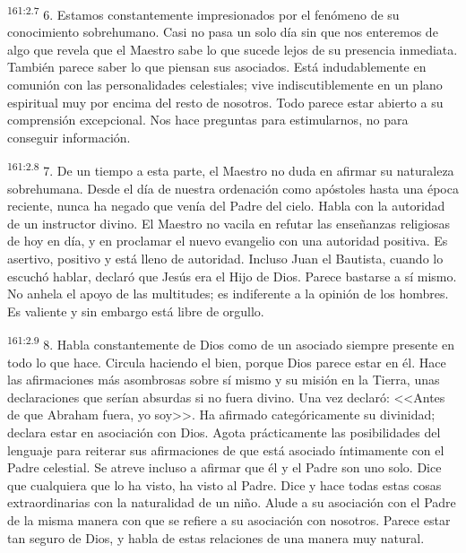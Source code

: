 \par 
\textsuperscript{161:2.7} 6. Estamos constantemente impresionados por el fenómeno de su conocimiento sobrehumano. Casi no pasa un solo día sin que nos enteremos de algo que revela que el Maestro sabe lo que sucede lejos de su presencia inmediata. También parece saber lo que piensan sus asociados. Está indudablemente en comunión con las personalidades celestiales; vive indiscutiblemente en un plano espiritual muy por encima del resto de nosotros. Todo parece estar abierto a su comprensión excepcional. Nos hace preguntas para estimularnos, no para conseguir información.

\par 
\textsuperscript{161:2.8} 7. De un tiempo a esta parte, el Maestro no duda en afirmar su naturaleza sobrehumana. Desde el día de nuestra ordenación como apóstoles hasta una época reciente, nunca ha negado que venía del Padre del cielo. Habla con la autoridad de un instructor divino. El Maestro no vacila en refutar las enseñanzas religiosas de hoy en día, y en proclamar el nuevo evangelio con una autoridad positiva. Es asertivo, positivo y está lleno de autoridad. Incluso Juan el Bautista, cuando lo escuchó hablar, declaró que Jesús era el Hijo de Dios. Parece bastarse a sí mismo. No anhela el apoyo de las multitudes; es indiferente a la opinión de los hombres. Es valiente y sin embargo está libre de orgullo.

\par 
\textsuperscript{161:2.9} 8. Habla constantemente de Dios como de un asociado siempre presente en todo lo que hace. Circula haciendo el bien, porque Dios parece estar en él. Hace las afirmaciones más asombrosas sobre sí mismo y su misión en la Tierra, unas declaraciones que serían absurdas si no fuera divino. Una vez declaró: <<Antes de que Abraham fuera, yo soy>>. Ha afirmado categóricamente su divinidad; declara estar en asociación con Dios. Agota prácticamente las posibilidades del lenguaje para reiterar sus afirmaciones de que está asociado íntimamente con el Padre celestial. Se atreve incluso a afirmar que él y el Padre son uno solo. Dice que cualquiera que lo ha visto, ha visto al Padre. Dice y hace todas estas cosas extraordinarias con la naturalidad de un niño. Alude a su asociación con el Padre de la misma manera con que se refiere a su asociación con nosotros. Parece estar tan seguro de Dios, y habla de estas relaciones de una manera muy natural.

